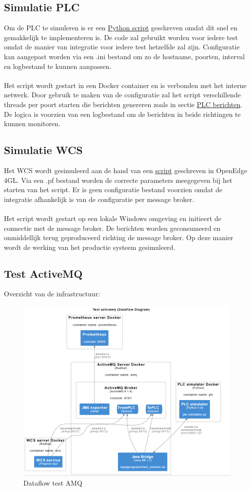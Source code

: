 \subsection{Simulatie PLC}
Om de PLC te simuleren is er een \hyperref[sec:codeplc]{Python script} geschreven omdat dit snel en gemakkelijk te implementeren is.
De code zal gebruikt worden voor iedere test omdat de manier van integratie voor iedere test hetzelfde zal zijn.
Configuratie kan aangepast worden via een .ini bestand om zo de hostname, poorten, interval en logbestand te kunnen aanpassen.
\\\\
Het script wordt gestart in een Docker container en is verbonden met het interne netwerk.
Door gebruik te maken van de configuratie zal het script verschillende threads per poort starten die berichten genereren
zoals in sectie \hyperref[listing:message_example]{PLC berichten}.
De logica is voorzien van een logbestand om de berichten in beide richtingen te kunnen monitoren.

\subsection{Simulatie WCS}
Het WCS wordt gesimuleerd aan de hand van een \hyperref[sec:sec:codewcs]{script} geschreven in OpenEdge 4GL.
Via een .pf bestand worden de correcte parameters meegegeven bij het starten van het script.
Er is geen configuratie bestand voorzien omdat de integratie afhankelijk is van de configuratie per message broker.
\\\\
Het script wordt gestart op een lokale Windows omgeving en initieert de connectie met de message broker.
De berichten worden geconsumeerd en onmiddellijk terug geproduceerd richting de message broker.
Op deze manier wordt de werking van het productie systeem gesimuleerd.

\subsection{Test ActiveMQ}
Overzicht van de infrastructuur:
\begin{figure}[h!]
  \centering
  \includegraphics[width=.5\textwidth]{img/test_amq_dataflow.png}
  \caption{\label{fig:test_amq_dataflow}Dataflow test AMQ}
\end{figure}

